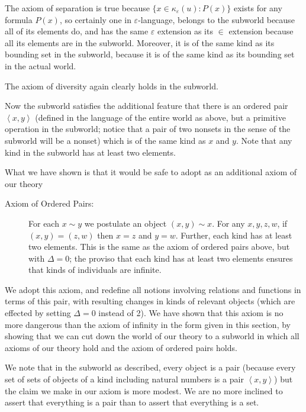 \documentclass[12pt]{article}
\begin{document}
The axiom of separation is true because $\{x \in \kappa_\varepsilon(u):P(x)\}$ exists for any formula $P(x)$, so certainly one in $\varepsilon$-language, belongs to the subworld because all of its elements do, and has the same $\varepsilon$ extension as its $\in$ extension because all its elements are in the subworld.  Moreover, it is of the same kind as its bounding set in the subworld, because it is of the same kind as its bounding set in the actual world.

The axiom of diversity again clearly holds in the subworld.

Now the subworld satisfies the additional feature that there is an ordered pair $\left<x,y\right>$ (defined in the language of the entire world as above, but a primitive operation in the subworld;  notice that a pair of two nonsets in the sense of the subworld will be a nonset) which is of the same kind as $x$ and $y$.  Note that any kind in the subworld has at least two elements.

What we have shown is that it would be safe to adopt as an additional axiom of our theory

\begin{description}

\item[Axiom of Ordered Pairs:]  For each $x \sim y$ we postulate an object $(x,y) \sim x$.  For any $x,y,z,w$, if $(x,y)=(z,w)$ then $x=z$ and $y=w$.  Further, each kind has at least two elements.  This is the same as the axiom of ordered pairs above, but with $\Delta=0$;  the proviso that each kind has at least two elements ensures that kinds of individuals are infinite.

\end{description}

We adopt this axiom, and redefine all notions involving relations and functions in terms of this pair, with resulting
changes in kinds of relevant objects (which are effected by setting $\Delta=0$ instead of 2).  We have shown that this axiom is no more dangerous than the axiom of infinity in the form given in this section, by showing that we can cut down the world of our theory to a subworld in which all axioms of our theory hold and the axiom of ordered pairs holds.

We note that in the subworld as described, every object is a pair (because every set of sets of objects of a kind including natural numbers is a pair $\left<x,y\right>$) but the claim we make in our axiom is more modest.  We are no more inclined to assert that everything is a pair than to assert that everything is a set.
\end{document}
